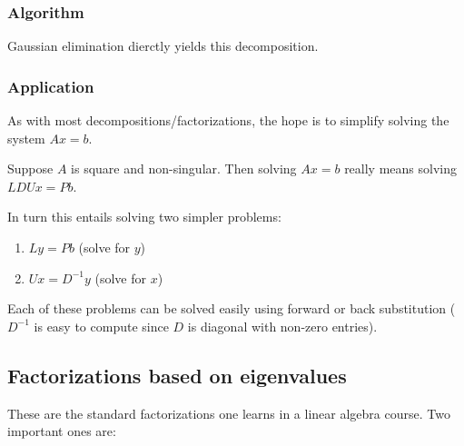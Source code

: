 \subsubsection*{Algorithm}

Gaussian elimination dierctly yields this decomposition.

\subsubsection*{Application}

As with most decompositions/factorizations, the hope is to simplify solving the system $Ax=b$. 

Suppose $A$ is square and non-singular. Then solving $Ax=b$ really means solving $LDUx = Pb$.

In turn this entails solving two simpler problems: 
\begin{enumerate}[label=(\roman*)]
    \item $Ly = Pb$ (solve for $y$)
    \item $Ux = D^{-1}y$ (solve for $x$)
\end{enumerate} 
Each of these problems can be solved easily using forward or back substitution ($D^{-1}$ is easy to compute since $D$ is diagonal with non-zero entries).

\subsection{Factorizations based on eigenvalues}

These are the standard factorizations one learns in a linear algebra course. Two important ones are:

